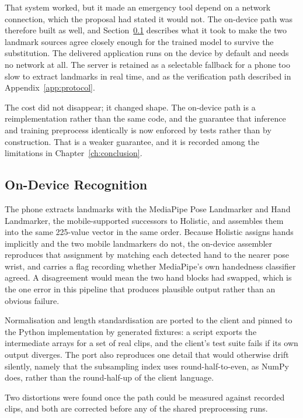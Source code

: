 That system worked, but it made an emergency tool depend on a network connection, which the proposal had stated it would not. The on-device path was therefore built as well, and Section~\ref{sec:ondevice} describes what it took to make the two landmark sources agree closely enough for the trained model to survive the substitution. The delivered application runs on the device by default and needs no network at all. The server is retained as a selectable fallback for a phone too slow to extract landmarks in real time, and as the verification path described in Appendix~\ref{app:protocol}.

The cost did not disappear; it changed shape. The on-device path is a reimplementation rather than the same code, and the guarantee that inference and training preprocess identically is now enforced by tests rather than by construction. That is a weaker guarantee, and it is recorded among the limitations in Chapter~\ref{ch:conclusion}.

\subsection{On-Device Recognition}
\label{sec:ondevice}

The phone extracts landmarks with the MediaPipe Pose Landmarker and Hand Landmarker, the mobile-supported successors to Holistic, and assembles them into the same 225-value vector in the same order. Because Holistic assigns hands implicitly and the two mobile landmarkers do not, the on-device assembler reproduces that assignment by matching each detected hand to the nearer pose wrist, and carries a flag recording whether MediaPipe's own handedness classifier agreed. A disagreement would mean the two hand blocks had swapped, which is the one error in this pipeline that produces plausible output rather than an obvious failure.

Normalisation and length standardisation are ported to the client and pinned to the Python implementation by generated fixtures: a script exports the intermediate arrays for a set of real clips, and the client's test suite fails if its own output diverges. The port also reproduces one detail that would otherwise drift silently, namely that the subsampling index uses round-half-to-even, as NumPy does, rather than the round-half-up of the client language.

Two distortions were found once the path could be measured against recorded clips, and both are corrected before any of the shared preprocessing runs.

